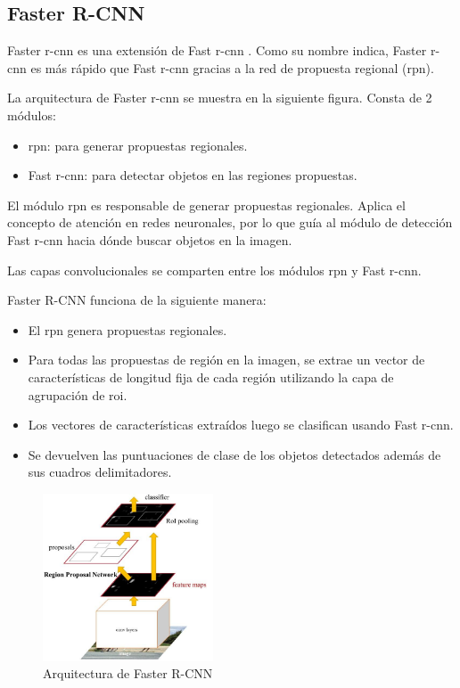 \subsection{Faster R-CNN}
\label{subsec:faster-rcnn}

Faster \gls{r-cnn} \cite{ren2016faster} es una extensión de Fast \gls{r-cnn} \cite{7410526}. Como su nombre indica, Faster \gls{r-cnn} es más rápido que Fast \gls{r-cnn} gracias a la red de propuesta regional (\gls{rpn}).

La arquitectura de Faster \gls{r-cnn} se muestra en la siguiente figura. Consta de 2 módulos:

\begin{itemize}
    \item \gls{rpn}: para generar propuestas regionales.
    \item Fast \gls{r-cnn}: para detectar objetos en las regiones propuestas.
\end{itemize}

El módulo \gls{rpn} es responsable de generar propuestas regionales. Aplica el concepto de atención en redes neuronales, por lo que guía al módulo de detección Fast \gls{r-cnn} hacia dónde buscar objetos en la imagen.

Las capas convolucionales se comparten entre los módulos \gls{rpn} y Fast \gls{r-cnn}.

Faster R-CNN funciona de la siguiente manera:

\begin{itemize}
    \item El \gls{rpn} genera propuestas regionales.
    \item Para todas las propuestas de región en la imagen, se extrae un vector de características de longitud fija de cada región utilizando la capa de agrupación de \gls{roi}.
    \item Los vectores de características extraídos luego se clasifican usando Fast \gls{r-cnn}.
    \item Se devuelven las puntuaciones de clase de los objetos detectados además de sus cuadros delimitadores.
\end{itemize}

\begin{figure}[ht]
\centering
\includegraphics[width=0.45\textwidth]{img/chapters/estado-del-arte/arquitectura-faster-rcnn.jpg}
\caption{\label{fig:arquitectura-faster-rcnn}Arquitectura de Faster R-CNN}
\end{figure}

